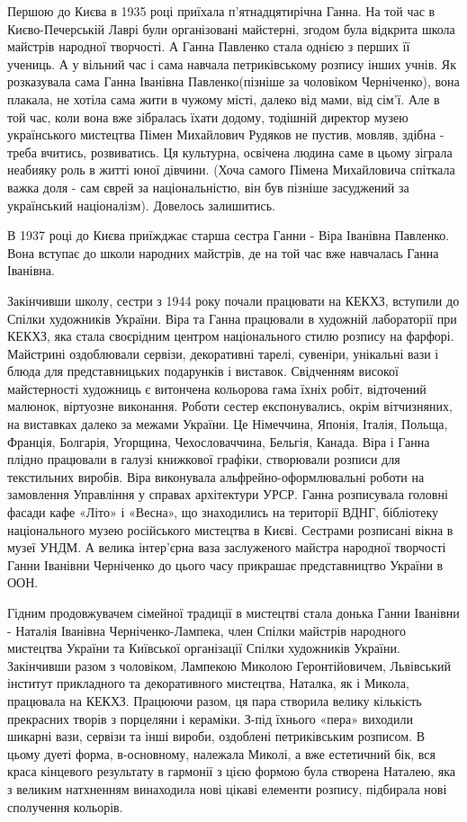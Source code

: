 Першою до Києва в 1935 році приїхала п'ятнадцятирічна Ганна. На той час в
Києво-Печерській Лаврі були організовані майстерні, згодом була відкрита
школа майстрів народної творчості. А Ганна Павленко стала однією з перших її
учениць. А у вільний час і сама навчала петриківському розпису інших учнів.
Як розказувала сама Ганна Іванівна Павленко(пізніше за чоловіком Черніченко),
вона плакала, не хотіла сама жити в чужому місті, далеко від мами, від сім'ї.
Але в той час, коли вона вже зібралась їхати додому, тодішній директор музею
українського мистецтва Пімен Михайлович Рудяков не пустив, мовляв, здібна -
треба вчитись, розвиватись. Ця культурна, освічена людина саме в цьому
зіграла неабияку роль в житті юної дівчини. (Хоча самого Пімена Михайловича
спіткала важка доля - сам єврей за національністю, він був пізніше засуджений
за український націоналізм). Довелось залишитись.

В 1937 році до Києва приїжджає старша сестра Ганни - Віра Іванівна Павленко.
Вона вступає до школи народних майстрів, де на той час вже навчалась Ганна
Іванівна. 

Закінчивши школу, сестри з 1944 року почали працювати на КЕКХЗ, вступили до
Спілки художників України. Віра та Ганна працювали в художній лабораторії при
КЕКХЗ, яка стала своєрідним центром національного стилю розпису на фарфорі.
Майстрині оздоблювали сервізи, декоративні тарелі, сувеніри, унікальні вази і
блюда для представницьких подарунків і виставок. Свідченням високої
майстерності художниць є витончена кольорова гама їхніх робіт, відточений
малюнок, віртуозне виконання. Роботи сестер експонувались, окрім вітчизняних,
на виставках далеко за межами України. Це Німеччина, Японія, Італія, Польща,
Франція, Болгарія, Угорщина, Чехословаччина, Бельгія, Канада. Віра і Ганна
плідно працювали в галузі книжкової графіки, створювали розписи для
текстильних виробів. Віра виконувала альфрейно-оформлювальні роботи на
замовлення Управління у справах архітектури УРСР. Ганна розписувала головні
фасади кафе «Літо» і «Весна», що знаходились на території ВДНГ, бібліотеку
національного музею російського мистецтва в Києві. Сестрами розписані вікна в
музеї УНДМ. А велика інтер'єрна ваза заслуженого майстра народної творчості
Ганни Іванівни Черніченко до цього часу прикрашає представництво України в
ООН.

Гідним продовжувачем сімейної традиції в мистецтві стала донька Ганни Іванівни
- Наталія Іванівна Черніченко-Лампека, член Спілки майстрів народного мистецтва
України та Київської організації Спілки художників України. Закінчивши разом з
чоловіком, Лампекою Миколою Геронтійовичем, Львівський інститут прикладного та
декоративного мистецтва, Наталка, як і Микола, працювала на КЕКХЗ. Працюючи
разом, ця пара створила велику кількість прекрасних творів з порцеляни і
кераміки. З-під їхнього «пера» виходили шикарні вази, сервізи та інші вироби,
оздоблені петриківським розписом. В цьому дуеті форма, в-основному, належала
Миколі, а вже естетичний бік, вся краса кінцевого результату в гармонії з цією
формою була створена Наталею, яка з великим натхненням винаходила нові цікаві
елементи розпису, підбирала нові сполучення кольорів.

